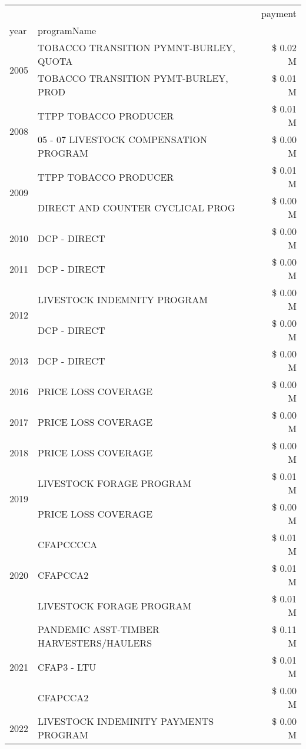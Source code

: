 \begin{tabular}{llr}
\toprule
 &  & payment \\
year & programName &  \\
\midrule
\multirow[t]{2}{*}{2005} & TOBACCO TRANSITION PYMNT-BURLEY, QUOTA & \$ 0.02 M \\
 & TOBACCO TRANSITION PYMT-BURLEY, PROD & \$ 0.01 M \\
\cline{1-3}
\multirow[t]{2}{*}{2008} & TTPP TOBACCO PRODUCER & \$ 0.01 M \\
 & 05 - 07 LIVESTOCK COMPENSATION PROGRAM & \$ 0.00 M \\
\cline{1-3}
\multirow[t]{2}{*}{2009} & TTPP TOBACCO PRODUCER & \$ 0.01 M \\
 & DIRECT AND COUNTER CYCLICAL PROG & \$ 0.00 M \\
\cline{1-3}
2010 & DCP - DIRECT & \$ 0.00 M \\
\cline{1-3}
2011 & DCP - DIRECT & \$ 0.00 M \\
\cline{1-3}
\multirow[t]{2}{*}{2012} & LIVESTOCK INDEMNITY PROGRAM & \$ 0.00 M \\
 & DCP - DIRECT & \$ 0.00 M \\
\cline{1-3}
2013 & DCP - DIRECT & \$ 0.00 M \\
\cline{1-3}
2016 & PRICE LOSS COVERAGE & \$ 0.00 M \\
\cline{1-3}
2017 & PRICE LOSS COVERAGE & \$ 0.00 M \\
\cline{1-3}
2018 & PRICE LOSS COVERAGE & \$ 0.00 M \\
\cline{1-3}
\multirow[t]{2}{*}{2019} & LIVESTOCK FORAGE PROGRAM & \$ 0.01 M \\
 & PRICE LOSS COVERAGE & \$ 0.00 M \\
\cline{1-3}
\multirow[t]{3}{*}{2020} & CFAPCCCCA & \$ 0.01 M \\
 & CFAPCCA2 & \$ 0.01 M \\
 & LIVESTOCK FORAGE PROGRAM & \$ 0.01 M \\
\cline{1-3}
\multirow[t]{3}{*}{2021} & PANDEMIC ASST-TIMBER HARVESTERS/HAULERS & \$ 0.11 M \\
 & CFAP3 - LTU & \$ 0.01 M \\
 & CFAPCCA2 & \$ 0.00 M \\
\cline{1-3}
2022 & LIVESTOCK INDEMINITY PAYMENTS PROGRAM & \$ 0.00 M \\
\cline{1-3}
\bottomrule
\end{tabular}
